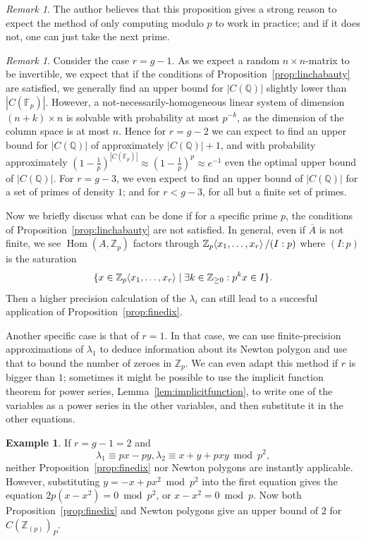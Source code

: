 \documentclass[12pt]{article}
\newcommand{\Z}{\mathbb{Z}}
\newcommand{\Q}{\mathbb{Q}}
\newcommand{\F}{\mathbb{F}}
\renewcommand{\angle}[1]{\hspace{-2pt}\left\langle #1 \right\rangle}
\DeclareMathOperator{\Hom}{Hom}
\theoremstyle{plain}
\theoremstyle{definition}
\newtheorem{exmp}[thm]{Example} %
\theoremstyle{remark}
\newtheorem{rem}[thm]{Remark} %
\begin{document}
\begin{rem}
The author believes that this proposition gives a strong reason to expect the method of only computing modulo $p$ to work in practice; and if it does not, one can just take the next prime.
\end{rem}
\begin{rem}
Consider the case $r=g-1$. As we expect a random $n\times n$-matrix to be invertible, we expect that if the conditions of Proposition~\ref{prop:linchabauty} are satisfied, we generally find an upper bound for $|C(\Q)|$ slightly lower than $|C(\F_p)|$. However, a not-necessarily-homogeneous linear system of dimension $(n+k)\times n$ is solvable with probability at most $p^{-k}$, as the dimension of the column space is at most $n$. Hence for $r = g-2$ we can expect to find an upper bound for $|C(\Q)|$ of approximately $|C(\Q)|+1$, and with probability approximately $(1-\frac{1}{p})^{|C(\F_p)|} \approx (1-\frac{1}{p})^p \approx e^{-1}$ even the optimal upper bound of $|C(\Q)|$. For $r = g-3$, we even expect to find an upper bound of $|C(\Q)|$ for a set of primes of density $1$; and for $r < g-3$, for all but a finite set of primes. 
\end{rem}

Now we briefly discuss what can be done if for a specific prime $p$, the conditions of Proposition~\ref{prop:linchabauty} are not satisfied. In general, even if $\overline{A}$ is not finite, we see $\Hom(A,\Z_p)$ factors through $\Z_p\angle{x_1,\dots,x_r}/(I:p)$ where $(I:p)$ is the saturation \[\{x \in \Z_p\angle{x_1,\dots,x_r} \mid \exists k \in \Z_{\geq 0}: p^kx \in I\}.\]
Then a higher precision calculation of the $\lambda_i$ can still lead to a succesful application of Proposition~\ref{prop:finedix}.

Another specific case is that of $r = 1$. In that case, we can use finite-precision approximations of $\lambda_1$ to deduce information about its Newton polygon and use that to bound the number of zeroes in $\Z_p$. We can even adapt this method if $r$ is bigger than $1$; sometimes it might be possible to use the implicit function theorem for power series, Lemma~\ref{lem:implicitfunction}, to write one of the variables as a power series in the other variables, and then substitute it in the other equations.

\begin{exmp}
If $r = g-1 = 2$ and \[\lambda_1 \equiv px-py,\lambda_2 \equiv x+y+pxy \bmod p^2,\] neither Proposition~\ref{prop:finedix} nor Newton polygons are instantly applicable. However, substituting $y = -x +px^2 \bmod p^2$ into the first equation gives the equation $2p(x-x^2) = 0 \bmod p^2$, or $x-x^2 = 0\bmod p$. Now both Proposition~\ref{prop:finedix} and Newton polygons give an upper bound of $2$ for $C(\Z_{(p)})_P$.
\end{exmp}
\end{document}
